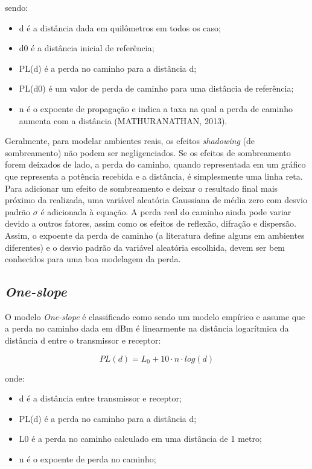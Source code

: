 \documentclass[
	12pt,				%
	openright,			%
	twoside,			%
	a4paper,			%
	english,			%
	french,				%
	spanish,			%
	brazil				%
	]{abntex2}
\begin{document}
sendo:

\begin{itemize}
	\item d é a distância dada em quilômetros em todos os caso;
	\item d0 é a distância inicial de referência;
	\item PL(d) é a perda no caminho para a distância d;
	\item PL(d0) é um valor de perda de caminho para uma distância de referência;
	\item n é o expoente de propagação e indica a taxa na qual a perda de caminho aumenta com a distância (MATHURANATHAN, 2013).
\end{itemize}

Geralmente, para modelar ambientes reais, os efeitos \textit{shadowing} (de sombreamento) não podem ser negligenciados. Se os efeitos de sombreamento forem deixados de lado, a perda do caminho, quando representada em um gráfico que representa a potência recebida e a distância, é simplesmente uma linha reta. Para adicionar  um efeito de sombreamento e deixar o resultado final mais próximo da realizada, uma variável aleatória Gaussiana de média zero com desvio padrão $ \sigma $ é adicionada à equação. A perda real do caminho ainda pode variar devido a outros fatores, assim como os efeitos de reflexão, difração e dispersão. Assim, o expoente da perda de caminho (a literatura define alguns em ambientes diferentes) e o desvio padrão da variável aleatória escolhida, devem ser bem conhecidos para uma boa modelagem da perda.

\subsection[One-slope]{\textit{One-slope}}

O modelo \textit{One-slope} é classificado como sendo um modelo empírico e assume que a perda no caminho dada em dBm é linearmente na distância logarítmica da distância d entre o transmissor e receptor:


\begin{equation}
PL(d) = L_{0} + 10 \cdot n \cdot log(d)
\end{equation}

onde:

\begin{itemize}
	\item d é a distância entre transmissor e receptor;
	\item PL(d) é a perda no caminho para a distância d;
	\item L0 é a perda no caminho calculado em uma distância de 1 metro;
	\item n é o expoente de perda no caminho;
\end{itemize}
\end{document}
